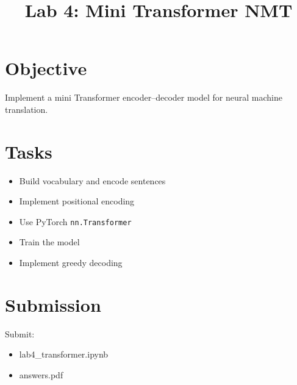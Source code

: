 \documentclass[12]{article}
\title{Lab 4: Mini Transformer NMT}
\date{}
\begin{document}
\maketitle

\section{Objective}
Implement a mini Transformer encoder–decoder model for neural machine translation.

\section{Tasks}
\begin{itemize}
\item Build vocabulary and encode sentences
\item Implement positional encoding
\item Use PyTorch \texttt{nn.Transformer}
\item Train the model
\item Implement greedy decoding
\end{itemize}

\section{Submission}
Submit:
\begin{itemize}
\item lab4_transformer.ipynb
\item answers.pdf
\end{itemize}
\end{document}
